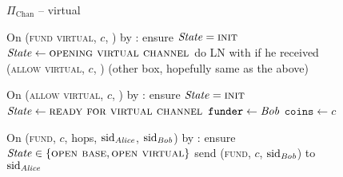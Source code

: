\begin{figure}[H]
  \begin{protocolbox}{$\Pi_{\mathrm{Chan}}$ -- virtual}
    \begin{algorithmic}[1]
      \State {}
      \State {}
      \State On (\textsc{fund virtual}, $c$, \bob) by \alice:
      \Indent
        \State ensure $\mathit{State} = \textsc{init}$
        \State $\mathit{State} \gets \textsc{opening virtual channel}$
        \State do LN with \bob if he received (\textsc{allow virtual}, $c$,
        \bob) (other box, hopefully same as the above) %
      \EndIndent
      \Statex

      \State {}
      \State On (\textsc{allow virtual}, $c$, \bob) by \alice:
      \Indent
        \State ensure $\mathit{State} = \textsc{init}$
        \State $\mathit{State} \gets \textsc{ready for virtual channel}$
        \State $\mathtt{funder} \gets \mathit{Bob}$
        \State $\mathtt{coins} \gets c$
      \EndIndent
      \Statex

      \State On (\textsc{fund}, $c$, hops, $\mathrm{sid}_{\mathit{Alice}}$,
      $\mathrm{sid}_{\mathit{Bob}}$) by \environment:
      \Indent
        \State ensure $\mathit{State} \in \{\textsc{open base}, \textsc{open
        virtual}\}$
          \State send (\textsc{fund}, $c$, $\mathrm{sid}_{\mathit{Bob}}$) to
          $\mathrm{sid}_{\mathit{Alice}}$
        \EndIf
      \EndIndent
    \end{algorithmic}
  \end{protocolbox}
  \caption{}
  \label{code:protocol:chan:skeleton:virtual}
\end{figure}
